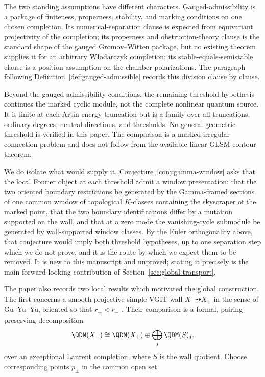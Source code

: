 The two standing assumptions have different characters.
Gauged-admissibility is a package of finiteness, properness, stability, and
marking conditions on one chosen completion.  Its numerical-separation
clause is
expected from equivariant projectivity of the completion; its
properness and obstruction-theory clause is the standard shape of the
gauged Gromov--Witten package, but no existing theorem supplies it for an
arbitrary W{\l}odarczyk completion; its stable-equals-semistable clause is a
position assumption on the chamber polarizations.  The paragraph
following Definition~\ref{def:gauged-admissible} records this division
clause by clause.

Beyond the gauged-admissibility conditions, the remaining threshold hypothesis
continues the marked cyclic module, not
the complete nonlinear quantum source.  It is finite at each Artin-energy
truncation but is a family over all truncations, ordinary degrees, neutral
directions, and thresholds.  No general geometric threshold is verified in
this paper.  The comparison is a marked irregular-connection problem and
does not follow from the available linear GLSM contour theorem.

We do isolate what would supply it.
Conjecture~\ref{conj:gamma-window} asks that the local Fourier object at each
threshold admit a window presentation: that the two oriented boundary
restrictions be generated by the Gamma-framed sections of one common window of
topological \(K\)-classes containing the skyscraper of the marked point, that
the two boundary identifications differ by a mutation supported on the wall,
and that at a zero mode the vanishing-cycle submodule be generated by
wall-supported window classes.  By the Euler orthogonality above, that
conjecture would imply both threshold hypotheses, up to one separation step
which we do not prove, and it is the route by which we expect them to be
removed.  It is new to this manuscript and unproved; stating
it precisely is the main forward-looking contribution of
Section~\ref{sec:global-transport}.

The paper also records two local results which motivated the global
construction.  The first concerns a smooth projective simple VGIT wall
\(X_-\dashrightarrow X_+\) in the sense of Gu--Yu--Yu, oriented so that
\(r_+<r_-\) \cite{GuYuYu}.  Their comparison is a formal, pairing-preserving
decomposition
\begin{equation}\label{eq:intro-vgit-decomposition}
 \QDM(X_-)
 \cong \QDM(X_+)\oplus\bigoplus_j\QDM(S)_j.
\end{equation}
over an exceptional Laurent completion, where \(S\) is the wall quotient.
Choose corresponding points \(p_\pm\) in the common open set.

